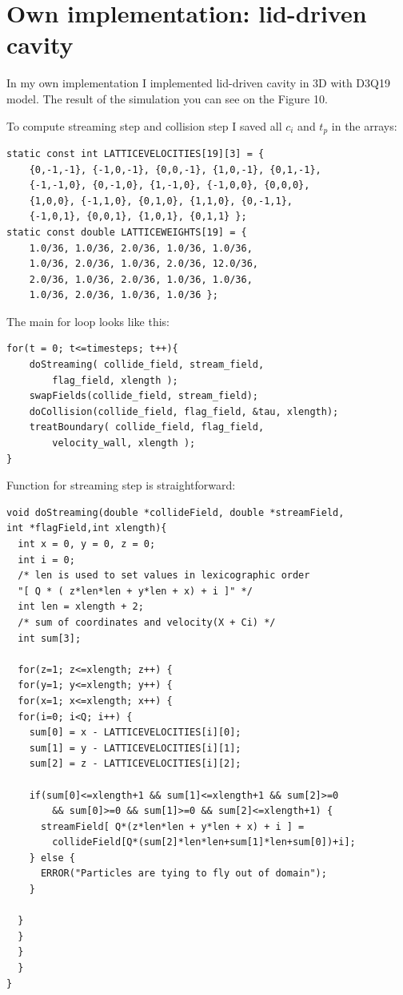 
\section{Own implementation: lid-driven cavity}

In my own implementation I implemented lid-driven cavity in 3D with D3Q19 model. The result of the simulation you can see on the Figure 10.

To compute streaming step and collision step I saved all $c_i$ and $t_p$ in the arrays:

\begin{lstlisting}
static const int LATTICEVELOCITIES[19][3] = {
    {0,-1,-1}, {-1,0,-1}, {0,0,-1}, {1,0,-1}, {0,1,-1},
    {-1,-1,0}, {0,-1,0}, {1,-1,0}, {-1,0,0}, {0,0,0},
    {1,0,0}, {-1,1,0}, {0,1,0}, {1,1,0}, {0,-1,1},
    {-1,0,1}, {0,0,1}, {1,0,1}, {0,1,1} };
static const double LATTICEWEIGHTS[19] = {
    1.0/36, 1.0/36, 2.0/36, 1.0/36, 1.0/36,
    1.0/36, 2.0/36, 1.0/36, 2.0/36, 12.0/36,
    2.0/36, 1.0/36, 2.0/36, 1.0/36, 1.0/36,
    1.0/36, 2.0/36, 1.0/36, 1.0/36 };
\end{lstlisting}

The main for loop looks like this:
\begin{lstlisting}
for(t = 0; t<=timesteps; t++){
    doStreaming( collide_field, stream_field,
        flag_field, xlength );
    swapFields(collide_field, stream_field);
    doCollision(collide_field, flag_field, &tau, xlength);
    treatBoundary( collide_field, flag_field,
        velocity_wall, xlength );
}
\end{lstlisting}

Function for streaming step is straightforward:
\begin{lstlisting}
void doStreaming(double *collideField, double *streamField,
int *flagField,int xlength){
  int x = 0, y = 0, z = 0;
  int i = 0;
  /* len is used to set values in lexicographic order
  "[ Q * ( z*len*len + y*len + x) + i ]" */
  int len = xlength + 2;
  /* sum of coordinates and velocity(X + Ci) */
  int sum[3];

  for(z=1; z<=xlength; z++) {
  for(y=1; y<=xlength; y++) {
  for(x=1; x<=xlength; x++) {
  for(i=0; i<Q; i++) {
    sum[0] = x - LATTICEVELOCITIES[i][0];
    sum[1] = y - LATTICEVELOCITIES[i][1];
    sum[2] = z - LATTICEVELOCITIES[i][2];

    if(sum[0]<=xlength+1 && sum[1]<=xlength+1 && sum[2]>=0 
        && sum[0]>=0 && sum[1]>=0 && sum[2]<=xlength+1) {
      streamField[ Q*(z*len*len + y*len + x) + i ] =
        collideField[Q*(sum[2]*len*len+sum[1]*len+sum[0])+i];
    } else {
      ERROR("Particles are tying to fly out of domain");
    }

  }
  }
  }
  }
}
\end{lstlisting}

